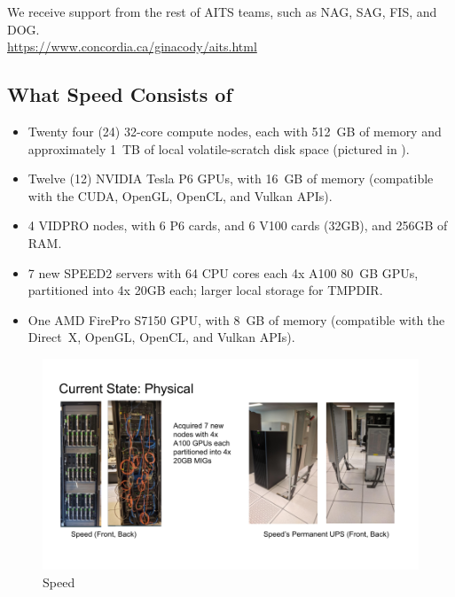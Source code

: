 \documentclass{easychair}
\begin{document}
\noindent We receive support from the rest of AITS teams, such as NAG, SAG, FIS, and DOG.\\
\url{https://www.concordia.ca/ginacody/aits.html}


\subsection{What Speed Consists of}
\label{sect:speed-arch}

\begin{itemize}
	\item
	Twenty four (24) 32-core compute nodes, each with 512~GB of memory and 
	approximately 1~TB of local volatile-scratch disk space (pictured in ).

	\item
	Twelve (12) NVIDIA Tesla P6 GPUs, with 16~GB of memory (compatible with the 
	CUDA, OpenGL, OpenCL, and Vulkan APIs). 

	\item
	4 VIDPRO nodes, with 6 P6 cards, and 6 V100 cards (32GB), and 
	256GB of RAM.

	\item
	7 new SPEED2 servers with 64 CPU cores each 4x A100 80~GB GPUs, partitioned
	into 4x 20GB each; larger local storage for TMPDIR.

	\item
	One AMD FirePro S7150 GPU, with 8~GB of memory (compatible with the
	Direct~X, OpenGL, OpenCL, and Vulkan APIs). 
\end{itemize}

\begin{figure}[htpb]
	\centering
	\includegraphics[width=\columnwidth]{images/speed-pics}
	\caption{Speed}
	\label{fig:speed-pics}
\end{figure}
\end{document}
